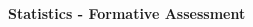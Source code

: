 \documentclass[12pt]{article}
\begin{document}
\begin{spacing}{1.5}
\centerline{\Large \bf Statistics - Formative Assessment}

\begin{enumerate}[{\bf (1)}]

\end{enumerate}
\end{spacing}
\end{document}

